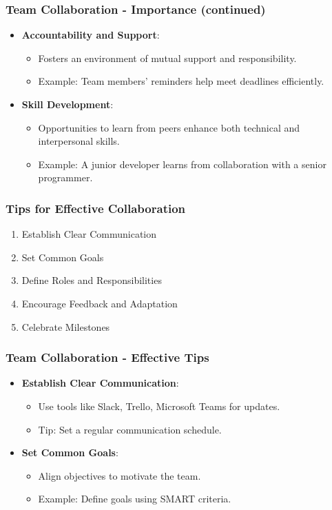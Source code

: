 \documentclass[aspectratio=169]{beamer}
\begin{document}
\begin{frame}[fragile]
    \frametitle{Team Collaboration - Importance (continued)}
    \begin{itemize}
        \item \textbf{Accountability and Support}:
            \begin{itemize}
                \item Fosters an environment of mutual support and responsibility.
                \item Example: Team members' reminders help meet deadlines efficiently.
            \end{itemize}
        \item \textbf{Skill Development}:
            \begin{itemize}
                \item Opportunities to learn from peers enhance both technical and interpersonal skills.
                \item Example: A junior developer learns from collaboration with a senior programmer.
            \end{itemize}
    \end{itemize}
\end{frame}

\begin{frame}[fragile]
    \frametitle{Tips for Effective Collaboration}
    \begin{enumerate}
        \item Establish Clear Communication
        \item Set Common Goals
        \item Define Roles and Responsibilities
        \item Encourage Feedback and Adaptation
        \item Celebrate Milestones
    \end{enumerate}
\end{frame}

\begin{frame}[fragile]
    \frametitle{Team Collaboration - Effective Tips}
    \begin{itemize}
        \item \textbf{Establish Clear Communication}:
            \begin{itemize}
                \item Use tools like Slack, Trello, Microsoft Teams for updates.
                \item Tip: Set a regular communication schedule.
            \end{itemize}
        \item \textbf{Set Common Goals}:
            \begin{itemize}
                \item Align objectives to motivate the team. 
                \item Example: Define goals using SMART criteria.
            \end{itemize}
    \end{itemize}
\end{frame}
\end{document}

